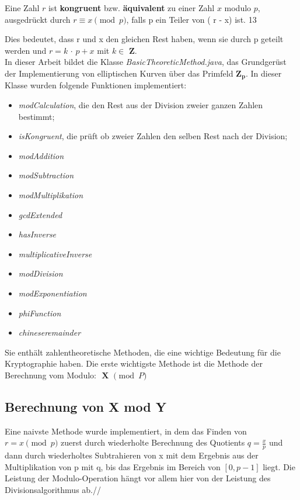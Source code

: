 Eine Zahl $ r $ ist \textbf{kongruent} bzw. \textbf{äquivalent} zu einer Zahl $ x $ modulo $ p $, ausgedrückt durch \( r \equiv x \pmod{p} \), falls p ein Teiler von ( r - x) ist. 
13


Dies bedeutet, dass r und x den gleichen Rest haben, wenn sie durch p geteilt werden und $ r = k $ $\cdot $ $ p + x $ mit  $ k \in $ $ \mathbf{Z} $.\\



In dieser Arbeit bildet  die Klasse \textit{BasicTheoreticMethod.java}, das Grundgerüst der Implementierung von elliptischen Kurven über das Primfeld $\mathbf{ Z_p} $. 
In dieser Klasse wurden folgende Funktionen implementiert:
\begin{itemize}
    \item \textit{modCalculation}, die den Rest aus der Division zweier ganzen Zahlen bestimmt; 
    \item \textit{isKongruent}, die prüft ob zweier Zahlen den selben Rest nach der Division;
    \item \textit{modAddition}
    \item \textit{modSubtraction}
    \item \textit{modMultiplikation}
    \item \textit{gcdExtended}
    \item \textit{hasInverse}
    \item \textit{multiplicativeInverse}
    \item \textit{modDivision}
    \item \textit{modExponentiation}
    \item \textit{phiFunction}
    \item \textit{chineseremainder}
\end{itemize}

Sie enthält zahlentheoretische Methoden, die eine wichtige Bedeutung für die Kryptographie haben.
Die erste wichtigste Methode ist die Methode der Berechnung vom Modulo: $\textbf{ X $\pmod P $} $

\subsection{Berechnung von X mod Y}


Eine naivste Methode wurde implementiert, in dem das Finden von $ r = x \pmod p $ zuerst
durch wiederholte Berechnung des Quotients $ q = \frac{x}{p} $ und dann durch
wiederholtes Subtrahieren von x mit dem Ergebnis aus der Multiplikation von p mit q, bis das Ergebnis im Bereich von $ [0, p - 1] $ liegt.
Die Leistung der Modulo-Operation hängt vor allem hier von der Leistung des Divisionsalgorithmus ab.//

